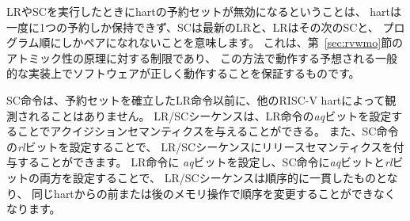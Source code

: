 \begin{commentary}
\begin{comment}
The invalidation of a hart's reservation when it executes an LR or SC
imply that a hart can only hold one reservation at a time, and that
an SC can only pair with the most recent LR, and LR with the next
following SC, in program order.  This is a restriction to the
Atomicity Axiom in Section~\ref{sec:rvwmo} that ensures software runs
correctly on expected common implementations that operate in this manner.
\end{comment}
LRやSCを実行したときにhartの予約セットが無効になるということは、
hartは一度に1つの予約しか保持できず、SCは最新のLRと、LRはその次のSCと、
プログラム順にしかペアになれないことを意味します。
これは、第~\ref{sec:rvwmo}節のアトミック性の原理に対する制限であり、
この方法で動作する予想される一般的な実装上でソフトウェアが正しく動作することを保証するものです。
\end{commentary}

\begin{comment}
An SC instruction can never be observed by another RISC-V hart
before the LR instruction that established the reservation.
The LR/SC
sequence can be given acquire semantics by setting the {\em aq} bit on
the LR instruction.  The LR/SC sequence can be given release semantics
by setting the {\em rl} bit on the SC instruction.  Setting the {\em
  aq} bit on the LR instruction, and setting both the {\em aq} and the {\em
  rl} bit on the SC instruction makes the LR/SC sequence sequentially
consistent, meaning that it cannot be reordered with earlier or
later memory operations from the same hart.
\end{comment}

SC命令は、予約セットを確立したLR命令以前に、他のRISC-V hartによって観測されることはありません。
LR/SCシーケンスは、LR命令の{\em aq}ビットを設定することでアクイジションセマンティクスを与えることができる。
また、SC命令の{\em rl}ビットを設定することで、
LR/SCシーケンスにリリースセマンティクスを付与することができます。
LR命令に {\em aq}ビットを設定し、SC命令に{\em aq}ビットと{\em rl}ビットの両方を設定することで、
LR/SCシーケンスは順序的に一貫したものとなり、
同じhartからの前または後のメモリ操作で順序を変更することができなくなります。

\begin{comment}
If neither bit is set on both LR and SC, the LR/SC sequence can be
observed to occur before or after surrounding memory operations from
the same RISC-V hart.  This can be appropriate when the LR/SC
sequence is used to implement a parallel reduction operation.
\end{comment}

